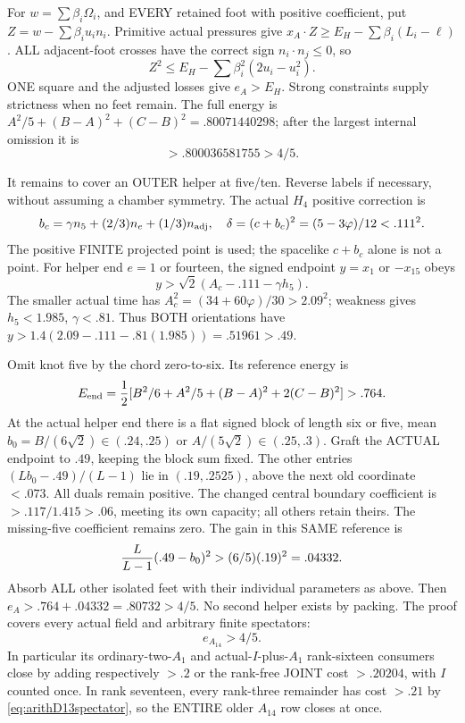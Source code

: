 For \(w=\sum\beta_i\Omega_i\), and EVERY retained
foot with positive coefficient, put
\(Z=w-\sum\beta_i u_i n_i\).
Primitive actual pressures give
\(x_A\cdot Z\ge E_H-\sum\beta_i(L_i-\ell)\).
ALL adjacent-foot crosses have the correct sign
\(n_i\cdot n_j\le0\), so
\[
 Z^2\le E_H-\sum\beta_i^2(2u_i-u_i^2).
\]
ONE square and the adjusted losses give \(e_A>E_H\).
Strong constraints supply strictness when no
feet remain.
The full energy is
\(A^2/5+(B-A)^2+(C-B)^2=.80071440298\);
after the largest internal omission it is
\[
                              >.800036581755>4/5 .
\]

It remains to cover an OUTER helper at five/ten.
Reverse labels if necessary, without assuming
a chamber symmetry.
The actual \(H_4\) positive correction is
\[
 b_c=\gamma n_5+(2/3)n_e+(1/3)n_{\rm adj},\quad
 \delta=(c+b_c)^2=(5-3\varphi)/12<.111^2 .
\]
The positive FINITE projected point is used;
the spacelike \(c+b_c\) alone is not a point.
For helper end \(e=1\) or fourteen, the signed
endpoint \(y=x_1\) or \(-x_{15}\) obeys
\[
                    y>\sqrt2(A_c-.111-\gamma h_5).
\]
The smaller actual time has
\(A_c^2=(34+60\varphi)/30>2.09^2\);
weakness gives \(h_5<1.985\), \(\gamma<.81\).
Thus BOTH orientations have
\(y>1.4(2.09-.111-.81(1.985))=.51961>.49\).

Omit knot five by the chord zero-to-six.
Its reference energy is
\[
 E_{\rm end}={1\over2}
       [B^2/6+A^2/5+(B-A)^2+2(C-B)^2]>.764 .
\]
At the actual helper end there is a flat signed
block of length six or five, mean
\(b_0=B/(6\sqrt2)\in(.24,.25)\) or
\(A/(5\sqrt2)\in(.25,.3)\).
Graft the ACTUAL endpoint to \(.49\),
keeping the block sum fixed.
The other entries
\((Lb_0-.49)/(L-1)\) lie in \((.19,.2525)\),
above the next old coordinate \(<.073\).
All duals remain positive.
The changed central boundary coefficient is
\(>.117/1.415>.06\), meeting its own capacity;
all others retain theirs.
The missing-five coefficient remains zero.
The gain in this SAME reference is
\[
                  {L\over L-1}(.49-b_0)^2
                                  >(6/5)(.19)^2=.04332 .
\]
Absorb ALL other isolated feet with their
individual parameters as above.
Then \(e_A>.764+.04332=.80732>4/5\).
No second helper exists by packing.
The proof covers every actual field and
arbitrary finite spectators:
\[
                                  e_{A_{14}}>4/5 .
\tag{A14U}\label{eq:arithA14universal}
\]
In particular its ordinary-two-\(A_1\) and
actual-\(I\)-plus-\(A_1\) rank-sixteen consumers
close by adding respectively \(>.2\) or the
rank-free JOINT cost \(>.20204\), with \(I\)
counted once.
In rank seventeen, every rank-three remainder
has cost \(>.21\) by
\eqref{eq:arithD13spectator}, so the ENTIRE
older \(A_{14}\) row closes at once.


